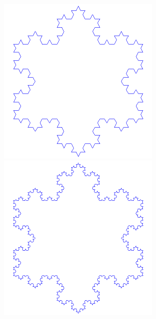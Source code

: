 \documentclass{beamer}
\begin{document}
\begin{frame}
\begin{columns}
\begin{overprint}
        \includegraphics[width=\textwidth]{images/koch-3}
        \includegraphics[width=\textwidth]{images/koch-4}

\end{overprint}
\end{columns}
\end{frame}
\end{document}
